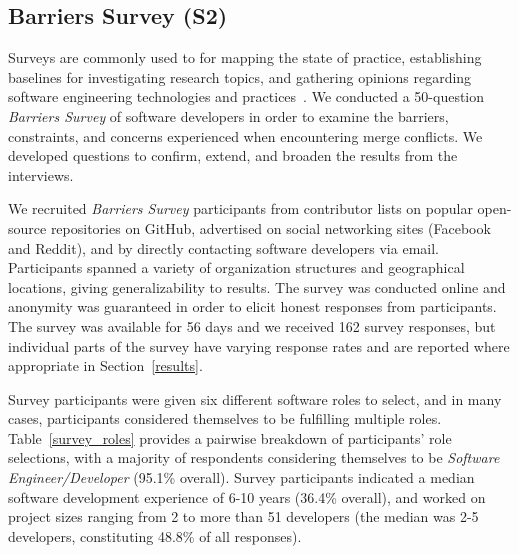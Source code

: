 \subsection{Barriers Survey (S2)}\label{perceptions_survey}

Surveys are commonly used to for mapping the state of practice, establishing baselines for investigating research topics, and gathering opinions regarding software engineering technologies and practices~\cite{deMello2016survey}.
We conducted a 50-question \textit{Barriers Survey} of software developers in order to examine the barriers, constraints, and concerns experienced when encountering merge conflicts.
We developed questions to confirm, extend, and broaden the results from the interviews.

\renewcommand*{\thefootnote}{\arabic{footnote}}
\setcounter{footnote}{0}
We recruited \textit{Barriers Survey} participants from contributor lists on popular open-source repositories on GitHub, advertised on social networking sites (Facebook and Reddit), and by directly contacting software developers via email. 
Participants spanned a variety of organization structures and geographical locations, giving generalizability to results.
The survey was conducted online and anonymity was guaranteed in order to elicit honest responses from participants.
The survey was available for 56 days and we received 162 survey responses, but individual parts of the survey have varying response rates and are reported where appropriate in Section~\ref{results}. 

Survey participants were given six different software roles to select, and in many cases, participants considered themselves to be fulfilling multiple roles. 
Table~\ref{survey_roles} provides a pairwise breakdown of participants' role selections, with a majority of respondents considering themselves to be \textit{Software Engineer/Developer} (95.1\% overall).
Survey participants indicated a median software development experience of 6-10 years (36.4\% overall), and worked on project sizes ranging from 2 to more than 51 developers (the median was 2-5 developers, constituting 48.8\% of all responses).


